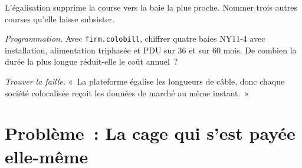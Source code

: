 \begin{exercise}[$\star\star$]\label{exo:nw:colocation-products-and-how-they-are-sold:6}
L'égalisation supprime la course vers la baie la plus proche. Nommer trois autres courses qu'elle laisse subsister.
\end{exercise}

\begin{exercise}[$\star\star\star$]\label{exo:nw:colocation-products-and-how-they-are-sold:7}
\emph{Programmation.} Avec \texttt{firm.colobill}, chiffrer quatre baies NY11-4 avec installation, alimentation triphasée et PDU sur 36 et sur 60
mois. De combien la durée la plus longue réduit-elle le coût annuel~?
\end{exercise}

\begin{exercise}[$\star\star\star$]\label{exo:nw:colocation-products-and-how-they-are-sold:8}
\emph{Trouver la faille.} «~La plateforme égalise les longueurs de câble, donc chaque société colocalisée reçoit les données de marché au même instant.~»
\end{exercise}

\section{Problème~: La cage qui s'est payée elle-même}

